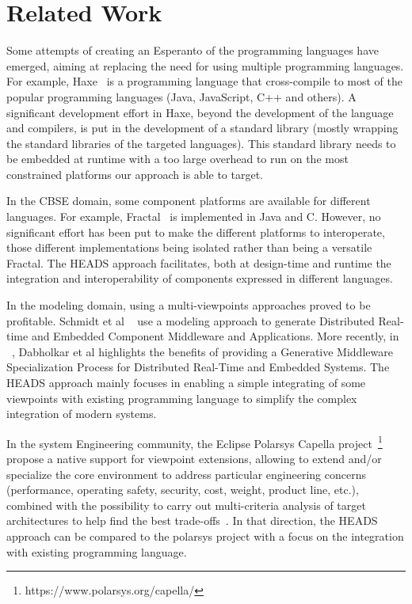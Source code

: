 \section{Related Work}

Some attempts of creating an Esperanto of the programming languages have emerged, aiming at replacing the need for using multiple programming languages. For example, Haxe~\cite{dasnois2011haxe} is a programming language that cross-compile to most of the popular programming languages (Java, JavaScript, C++ and others). A significant development effort in Haxe, beyond the development of the language and compilers, is put in the development of a standard library (mostly wrapping the standard libraries of the targeted languages). This standard library needs to be embedded at runtime with a too large overhead to run on the most constrained platforms our approach is able to target. 

In the CBSE domain, some component platforms are available for different languages. For example, Fractal~\cite{bruneton2006fractal} is implemented in Java and C. However, no significant effort has been put to make the different platforms to interoperate, those different implementations being isolated rather than being a versatile Fractal. The HEADS approach facilitates, both at design-time and runtime the integration and interoperability of components expressed in different languages.

In the modeling domain, using a multi-viewpoints approaches proved to be profitable. Schmidt et al ~\cite{DBLP:conf/middleware/GokhaleSLNW03} use a modeling approach to generate Distributed Real-time and Embedded Component Middleware and Applications. More recently, in  ~\cite{5753608}, Dabholkar et al highlights the benefits of providing a Generative Middleware Specialization Process for Distributed Real-Time and Embedded Systems.  The HEADS approach  mainly focuses in enabling a simple integrating of some viewpoints with existing programming language to simplify the complex integration of modern systems. 

In the system Engineering community, the Eclipse Polarsys Capella project~\footnote{https://www.polarsys.org/capella/} propose a native support for viewpoint extensions, allowing to extend and/or specialize the core environment to address particular engineering concerns (performance, operating safety, security, cost, weight, product line, etc.), combined with the possibility to carry out multi-criteria analysis of target architectures to help find the best trade-offs~\cite{voirin2013arcadia}. In that direction, the HEADS approach can be compared to the polarsys project with a focus on the integration with existing programming language.


